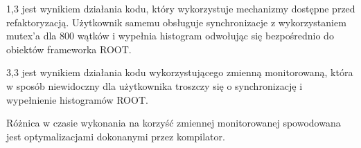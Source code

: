 1,3 jest wynikiem działania kodu, który wykorzystuje mechanizmy dostępne przed refaktoryzacją.
Użytkownik samemu obsługuje synchronizacje z wykorzystaniem mutex'a dla 800 wątków i wypełnia histogram odwołując się bezpośrednio do obiektów frameworka ROOT.

3,3 jest wynikiem działania kodu wykorzystującego zmienną monitorowaną, która w sposób niewidoczny dla użytkownika troszczy się o synchronizację i wypełnienie histogramów ROOT. 

Różnica w czasie wykonania na korzyść zmiennej monitorowanej spowodowana jest optymalizacjami dokonanymi przez kompilator.